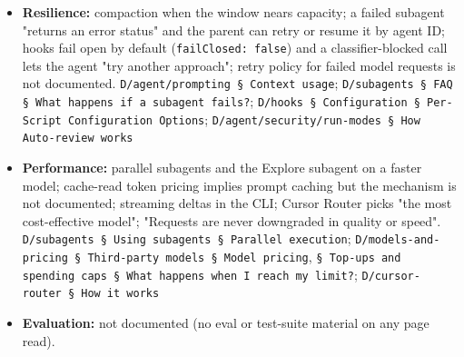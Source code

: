 \begin{itemize}
\item \textbf{Resilience:} compaction when the window nears capacity; a failed subagent "returns an error status" and the parent can retry or resume it by agent ID; hooks fail open by default (\texttt{failClosed:\allowbreak{} false}) and a classifier-blocked call lets the agent "try another approach"; retry policy for failed model requests is not documented. \texttt{D/\allowbreak{}agent/\allowbreak{}prompting § Context usage}; \texttt{D/\allowbreak{}subagents § FAQ § What happens if a subagent fails?}; \texttt{D/\allowbreak{}hooks § Configuration § Per-\allowbreak{}Script Configuration Options}; \texttt{D/\allowbreak{}agent/\allowbreak{}security/\allowbreak{}run-\allowbreak{}modes § How Auto-\allowbreak{}review works}
\item \textbf{Performance:} parallel subagents and the Explore subagent on a faster model; cache-read token pricing implies prompt caching but the mechanism is not documented; streaming deltas in the CLI; Cursor Router picks "the most cost-effective model"; "Requests are never downgraded in quality or speed". \texttt{D/\allowbreak{}subagents § Using subagents § Parallel execution}; \texttt{D/\allowbreak{}models-\allowbreak{}and-\allowbreak{}pricing § Third-\allowbreak{}party models § Model pricing}, \texttt{§ Top-\allowbreak{}ups and spending caps § What happens when I reach my limit?}; \texttt{D/\allowbreak{}cursor-\allowbreak{}router § How it works}
\item \textbf{Evaluation:} not documented (no eval or test-suite material on any page read).
\end{itemize}

